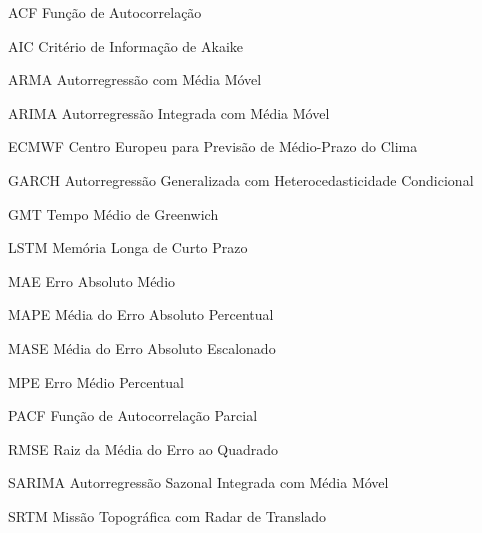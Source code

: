 \documentclass[
	12pt,				%
	openright,			%
	oneside,			%
	a4paper,			%
	english,			%
	french,				%
	spanish,			%
	brazil				%
	]{abntex2}
\begin{document}
\begin{siglas}
  \item[ACF] Função de Autocorrelação
  \item[AIC] Critério de Informação de Akaike
  \item[ARMA] Autorregressão com Média Móvel
  \item[ARIMA] Autorregressão Integrada com Média Móvel
  \item[ECMWF] Centro Europeu para Previsão de Médio-Prazo do Clima
  \item[GARCH] Autorregressão Generalizada com Heterocedasticidade Condicional
  \item[GMT] Tempo Médio de Greenwich
  \item[LSTM] Memória Longa de Curto Prazo
  \item[MAE] Erro Absoluto Médio
  \item[MAPE] Média do Erro Absoluto Percentual
  \item[MASE] Média do Erro Absoluto Escalonado
  \item[MPE] Erro Médio Percentual
  \item[PACF] Função de Autocorrelação Parcial
  \item[RMSE] Raiz da Média do Erro ao Quadrado
  \item[SARIMA] Autorregressão Sazonal Integrada com Média Móvel
  \item[SRTM] Missão Topográfica com Radar de Translado
\end{siglas}


\tableofcontents*



\textual

\end{document}
